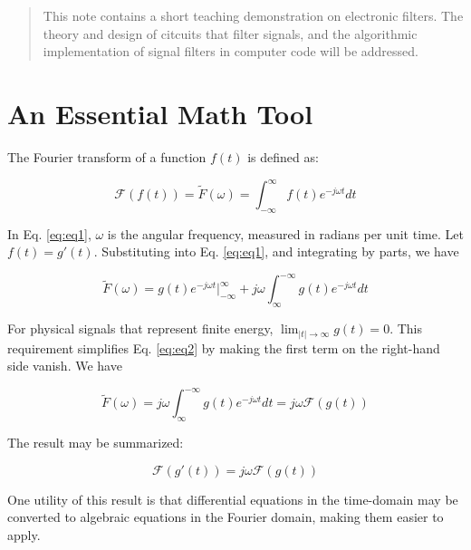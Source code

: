 \documentclass[12pt]{article}
\begin{document}
\maketitle

\begin{abstract}
This note contains a short teaching demonstration on electronic filters.  The theory and design of citcuits that filter signals, and the algorithmic implementation of signal filters in computer code will be addressed.
\end{abstract}

\section{An Essential Math Tool}

The Fourier transform of a function $f(t)$ is defined as:

\begin{equation}
\mathcal{F}(f(t)) = \tilde{F}(\omega) = \int_{-\infty}^{\infty} f(t) e^{-j\omega t} dt
\label{eq:eq1}
\end{equation}

In Eq. \ref{eq:eq1}, $\omega$ is the angular frequency, measured in radians per unit time.  Let $f(t) = g'(t)$.  Substituting into Eq. \ref{eq:eq1}, and integrating by parts, we have

\begin{equation}
\tilde{F}(\omega) = g(t) e^{-j\omega t} |_{-\infty}^{\infty} + j\omega \int_{\infty}^{-\infty} g(t)  e^{-j\omega t} dt
\label{eq:eq2}
\end{equation}

For physical signals that represent finite energy, $\lim_{|t|\rightarrow\infty} g(t) = 0$.  This requirement simplifies Eq. \ref{eq:eq2} by making the first term on the right-hand side vanish.  We have

\begin{equation}
\tilde{F}(\omega) = j\omega \int_{\infty}^{-\infty} g(t)  e^{-j\omega t} dt = j\omega\mathcal{F}(g(t))
\end{equation}

The result may be summarized:

\begin{equation}
\boxed{
\mathcal{F}(g'(t)) = j\omega\mathcal{F}(g(t))
}
\end{equation}

One utility of this result is that differential equations in the time-domain may be converted to algebraic equations in the Fourier domain, making them easier to apply.
\end{document}
